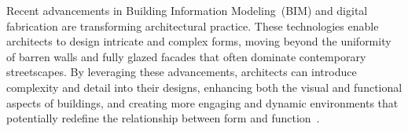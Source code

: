 



Recent advancements in Building Information Modeling~(BIM) and digital fabrication are transforming architectural practice.
These technologies enable architects to design intricate and complex forms, moving beyond the uniformity of barren walls and fully glazed facades that often dominate contemporary streetscapes.
By leveraging these advancements, architects can introduce complexity and detail into their designs, enhancing both the visual and functional aspects of buildings, and creating more engaging and dynamic environments that potentially redefine the relationship between form and function~\cite{Leach2016}.



